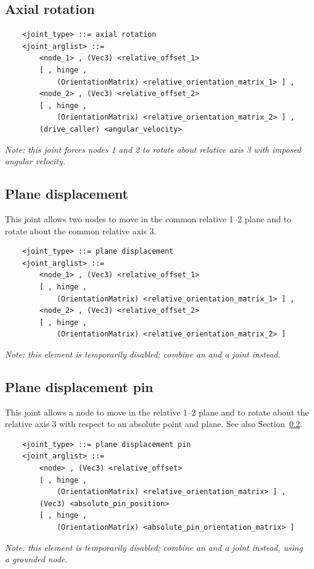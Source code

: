 \subsection{Axial rotation}
\begin{verbatim}
    <joint_type> ::= axial rotation
    <joint_arglist> ::= 
        <node_1> , (Vec3) <relative_offset_1> 
        [ , hinge , 
            (OrientationMatrix) <relative_orientation_matrix_1> ] ,
        <node_2> , (Vec3) <relative_offset_2>
        [ , hinge , 
            (OrientationMatrix) <relative_orientation_matrix_2> ] ,
        (drive_caller) <angular_velocity>
\end{verbatim}
{\em
    Note: this joint forces nodes 1 and 2 to rotate about relative 
    axis 3 with imposed angular velocity.
}

\subsection{Plane displacement}\label{sec:PLANE_DISPLACEMENT}
This joint allows two nodes to move in the common relative 1--2 plane 
and to rotate about the common relative axis 3.
\begin{verbatim}
    <joint_type> ::= plane displacement
    <joint_arglist> ::= 
        <node_1> , (Vec3) <relative_offset_1> 
        [ , hinge , 
            (OrientationMatrix) <relative_orientation_matrix_1> ] ,
        <node_2> , (Vec3) <relative_offset_2>
        [ , hinge , 
            (OrientationMatrix) <relative_orientation_matrix_2> ]
\end{verbatim}
\emph{Note: this element is temporarily disabled;
combine an  and a  joint instead.}

\subsection{Plane displacement pin}
This joint allows a node to move in the relative 1--2 plane 
and to rotate about the relative axis 3 with respect to an absolute point 
and plane.
See also Section~\ref{sec:PLANE_DISPLACEMENT}.
\begin{verbatim}
    <joint_type> ::= plane displacement pin
    <joint_arglist> ::= 
        <node> , (Vec3) <relative_offset>
        [ , hinge , 
            (OrientationMatrix) <relative_orientation_matrix> ] ,
        (Vec3) <absolute_pin_position>
        [ , hinge , 
            (OrientationMatrix) <absolute_pin_orientation_matrix> ]
\end{verbatim}
\emph{Note: this element is temporarily disabled;
combine an  and a  joint instead,
using a grounded node.}


